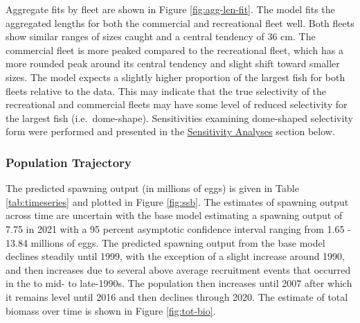 \documentclass[11pt,
  english,
  letterpaper,
]{article}
\begin{document}
\leavevmode\tagmcend\tagstructend\par


Aggregate fits by fleet are shown in Figure \ref{fig:agg-len-fit}. The model fits the aggregated lengths for both the commercial and recreational fleet well. Both fleets show similar ranges of sizes caught and a central tendency of 36 cm. The commercial fleet is more peaked compared to the recreational fleet, which has a more rounded peak around its central tendency and slight shift toward smaller sizes. The model expects a slightly higher proportion of the largest fish for both fleets relative to the data. This may indicate that the true selectivity of the recreational and commercial fleets may have some level of reduced selectivity for the largest fish (i.e.~dome-shape). Sensitivities examining dome-shaped selectivity form were performed and presented in the {\protect\hyperlink{sensitivity-analyses}{Sensitivity Analyses}\leavevmode\tagmcend\tagstructend} section below.

\leavevmode\tagmcend\tagstructend\par


\hypertarget{population-trajectory}{%
\subsubsection{Population Trajectory}\label{population-trajectory}}

\leavevmode\tagmcend\tagstructend


The predicted spawning output (in millions of eggs) is given in Table \ref{tab:timeseries} and plotted in Figure \ref{fig:ssb}. The estimates of spawning output across time are uncertain with the base model estimating a spawning output of 7.75 in 2021 with a 95 percent asymptotic confidence interval ranging from 1.65 - 13.84 millions of eggs. The predicted spawning output from the base model declines steadily until 1999, with the exception of a slight increase around 1990, and then increases due to several above average recruitment events that occurred in the to mid- to late-1990s. The population then increases until 2007 after which it remains level until 2016 and then declines through 2020. The estimate of total biomass over time is shown in Figure \ref{fig:tot-bio}.
\end{document}
